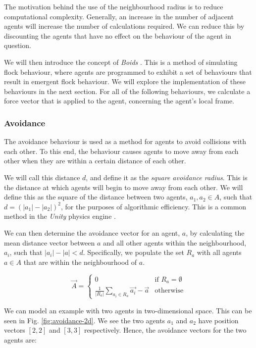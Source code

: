 \documentclass[12pt]{article}
\begin{document}
The motivation behind the use of the neighbourhood radius is to reduce computational complexity. Generally, an increase in the number of adjacent agents will increase the number of calculations required. We can reduce this by discounting the agents that have no effect on the behaviour of the agent in question.

We will then introduce the concept of \emph{Boids} \cite{Reynolds}. This is a method of simulating flock behaviour, where agents are programmed to exhibit a set of behaviours that result in emergent flock behaviour. We will explore the implementation of these behaviours in the next section. For all of the following behaviours, we calculate a force vector that is applied to the agent, concerning the agent's local frame.

\subsubsection{Avoidance}

The avoidance behaviour is used as a method for agents to avoid collisions with each other. To this end, the behaviour causes agents to move away from each other when they are within a certain distance of each other. 

We will call this distance $d$, and define it as the \emph{square avoidance radius}. This is the distance at which agents will begin to move away from each other. We will define this as the square of the distance between two agents, $a_1,a_2 \in A$, such that $d = (|a_1|-|a_2|)^2$, for the purposes of algorithmic efficiency. This is a common method in the \emph{Unity} physics engine \cite{unity}.

We can then determine the avoidance vector for an agent, $a$, by calculating the mean distance vector between $a$ and all other agents within the neighbourhood, $a_i$, such that $|a_i| - |a| < d$. Specifically, we populate the set $R_a$ with all agents $a \in A$ that are within the neighbourhood of $a$.

\begin{equation}
\vec{A} = 
\begin{cases}
    0 & \text{if } R_a = \emptyset \\
    \frac{1}{|R_a|} \sum_{a_i \in R_a} \vec{a_i} - \vec{a} & \text{otherwise}
\end{cases}
\end{equation}

We can model an example with two agents in two-dimensional space. This can be seen in Fig. \ref{fig:avoidance-2d}. We see the two agents $a_1$ and $a_2$ have position vectors $[2,2]$ and $[3,3]$ respectively. Hence, the avoidance vectors for the two agents are:
\end{document}
